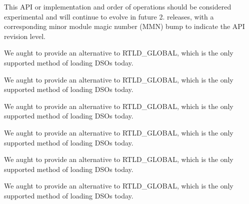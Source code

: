 \begin{DoxyRefList}
This A\+PI or implementation and order of operations should be considered experimental and will continue to evolve in future 2. releases, with a corresponding minor module magic number (M\+MN) bump to indicate the A\+PI revision level.  
\item[\label{bug__bug000010}%
\hypertarget{bug__bug000010}{}%
Global \hyperlink{group__apr__user_ga57b4c6adc3e9d22eeaeb32c8faafcc83}{A\+P\+R\+\_\+\+D\+E\+C\+L\+A\+RE} (apr\+\_\+status\+\_\+t) apr\+\_\+uid\+\_\+current(apr\+\_\+uid\+\_\+t $\ast$userid]We aught to provide an alternative to R\+T\+L\+D\+\_\+\+G\+L\+O\+B\+AL, which is the only supported method of loading D\+S\+Os today.  
\item[\label{bug__bug000010}%
\hypertarget{bug__bug000010}{}%
Global \hyperlink{group__apr__user_ga57b4c6adc3e9d22eeaeb32c8faafcc83}{A\+P\+R\+\_\+\+D\+E\+C\+L\+A\+RE} (apr\+\_\+status\+\_\+t) apr\+\_\+uid\+\_\+current(apr\+\_\+uid\+\_\+t $\ast$userid]We aught to provide an alternative to R\+T\+L\+D\+\_\+\+G\+L\+O\+B\+AL, which is the only supported method of loading D\+S\+Os today.  
\item[\label{bug__bug000010}%
\hypertarget{bug__bug000010}{}%
Global \hyperlink{group__apr__user_ga57b4c6adc3e9d22eeaeb32c8faafcc83}{A\+P\+R\+\_\+\+D\+E\+C\+L\+A\+RE} (apr\+\_\+status\+\_\+t) apr\+\_\+uid\+\_\+current(apr\+\_\+uid\+\_\+t $\ast$userid]We aught to provide an alternative to R\+T\+L\+D\+\_\+\+G\+L\+O\+B\+AL, which is the only supported method of loading D\+S\+Os today.  
\item[\label{bug__bug000010}%
\hypertarget{bug__bug000010}{}%
Global \hyperlink{group__apr__user_ga57b4c6adc3e9d22eeaeb32c8faafcc83}{A\+P\+R\+\_\+\+D\+E\+C\+L\+A\+RE} (apr\+\_\+status\+\_\+t) apr\+\_\+uid\+\_\+current(apr\+\_\+uid\+\_\+t $\ast$userid]We aught to provide an alternative to R\+T\+L\+D\+\_\+\+G\+L\+O\+B\+AL, which is the only supported method of loading D\+S\+Os today.  
\item[\label{bug__bug000010}%
\hypertarget{bug__bug000010}{}%
Global \hyperlink{group__apr__user_ga57b4c6adc3e9d22eeaeb32c8faafcc83}{A\+P\+R\+\_\+\+D\+E\+C\+L\+A\+RE} (apr\+\_\+status\+\_\+t) apr\+\_\+uid\+\_\+current(apr\+\_\+uid\+\_\+t $\ast$userid]We aught to provide an alternative to R\+T\+L\+D\+\_\+\+G\+L\+O\+B\+AL, which is the only supported method of loading D\+S\+Os today.  
\item[\label{bug__bug000010}%
\hypertarget{bug__bug000010}{}%
Global \hyperlink{group__apr__user_ga57b4c6adc3e9d22eeaeb32c8faafcc83}{A\+P\+R\+\_\+\+D\+E\+C\+L\+A\+RE} (apr\+\_\+status\+\_\+t) apr\+\_\+uid\+\_\+current(apr\+\_\+uid\+\_\+t $\ast$userid]We aught to provide an alternative to R\+T\+L\+D\+\_\+\+G\+L\+O\+B\+AL, which is the only supported method of loading D\+S\+Os today.  

\end{DoxyRefList}
